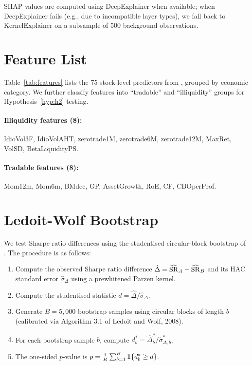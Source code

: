 SHAP values are computed using DeepExplainer when available; when DeepExplainer fails (e.g., due to incompatible layer types), we fall back to KernelExplainer on a subsample of 500 background observations.


\section{Feature List}
\label{app:features}

Table~\ref{tab:features} lists the 75 stock-level predictors from \citet{chen2022open}, grouped by economic category. We further classify features into ``tradable'' and ``illiquidity'' groups for Hypothesis~\ref{hyp:h2} testing.

% 

\paragraph{Illiquidity features (8):} IdioVol3F, IdioVolAHT, zerotrade1M, zerotrade6M, zerotrade12M, MaxRet, VolSD, BetaLiquidityPS.

\paragraph{Tradable features (8):} Mom12m, Mom6m, BMdec, GP, AssetGrowth, RoE, CF, CBOperProf.


\section{Ledoit-Wolf Bootstrap}
\label{app:bootstrap}

We test Sharpe ratio differences using the studentised circular-block bootstrap of \citet{ledoit2008robust}. The procedure is as follows:

\begin{enumerate}
\item Compute the observed Sharpe ratio difference $\hat{\Delta} = \widehat{\mathrm{SR}}_A - \widehat{\mathrm{SR}}_B$ and its HAC standard error $\hat{\sigma}_{\Delta}$ using a prewhitened Parzen kernel.
\item Compute the studentised statistic $d = \hat{\Delta} / \hat{\sigma}_{\Delta}$.
\item Generate $B = 5{,}000$ bootstrap samples using circular blocks of length $b$ (calibrated via Algorithm 3.1 of Ledoit and Wolf, 2008).
\item For each bootstrap sample $b$, compute $d^*_b = \hat{\Delta}^*_b / \hat{\sigma}^*_{\Delta,b}$.
\item The one-sided $p$-value is $p = \frac{1}{B}\sum_{b=1}^{B} \bm{1}\{d^*_b \geq d\}$.
\end{enumerate}


